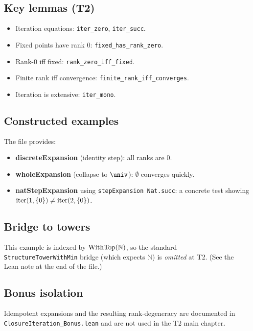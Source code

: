 \subsection{Key lemmas (T2)}
\begin{itemize}
\item Iteration equations: \texttt{iter\_zero}, \texttt{iter\_succ}.
\item Fixed points have rank $0$: \texttt{fixed\_has\_rank\_zero}.
\item Rank-$0$ iff fixed: \texttt{rank\_zero\_iff\_fixed}.
\item Finite rank iff convergence: \texttt{finite\_rank\_iff\_converges}.
\item Iteration is extensive: \texttt{iter\_mono}.
\end{itemize}

\subsection{Constructed examples}
The file provides:
\begin{itemize}
\item \textbf{discreteExpansion} (identity step): all ranks are $0$.
\item \textbf{wholeExpansion} (collapse to $\univ$): $\emptyset$ converges quickly.
\item \textbf{natStepExpansion} using \texttt{stepExpansion Nat.succ}: a concrete test showing
  $\operatorname{iter}(1,\{0\}) \neq \operatorname{iter}(2,\{0\})$.
\end{itemize}

\subsection{Bridge to towers}
This example is indexed by $\operatorname{WithTop}(\mathbb{N})$, so the standard
\texttt{StructureTowerWithMin} bridge (which expects $\mathbb{N}$) is \emph{omitted} at T2.
(See the Lean note at the end of the file.)

\subsection{Bonus isolation}
Idempotent expansions and the resulting rank-degeneracy are documented in
\texttt{ClosureIteration\_Bonus.lean} and are not used in the T2 main chapter.
